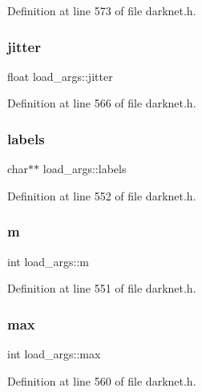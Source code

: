 Definition at line 573 of file darknet.\+h.

\mbox{\label{structload__args_ad446757635db989216a02b331d254906}} 
\subsubsection{\texorpdfstring{jitter}{jitter}}
{\footnotesize\ttfamily float load\+\_\+args\+::jitter}



Definition at line 566 of file darknet.\+h.

\mbox{\label{structload__args_a66b04c5770c0b451fa14a4a87258be9d}} 
\subsubsection{\texorpdfstring{labels}{labels}}
{\footnotesize\ttfamily char$\ast$$\ast$ load\+\_\+args\+::labels}



Definition at line 552 of file darknet.\+h.

\mbox{\label{structload__args_aca89fa6ea8f11383062a905539477001}} 
\subsubsection{\texorpdfstring{m}{m}}
{\footnotesize\ttfamily int load\+\_\+args\+::m}



Definition at line 551 of file darknet.\+h.

\mbox{\label{structload__args_a7f5319b3ca7889ed85ac8cc60de8a40d}} 
\subsubsection{\texorpdfstring{max}{max}}
{\footnotesize\ttfamily int load\+\_\+args\+::max}



Definition at line 560 of file darknet.\+h.

